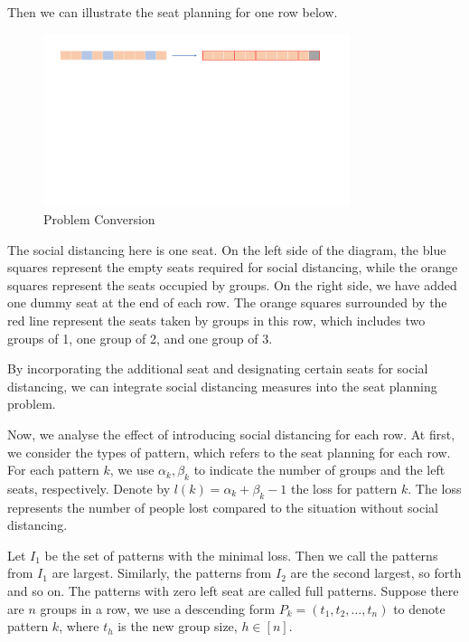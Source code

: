 Then we can illustrate the seat planning for one row below. 

\begin{figure}[ht]
    \centering
    \includegraphics[width = 0.8\textwidth]{./Figures/dummy_seat.pdf}
    \caption{Problem Conversion}
\end{figure}

The social distancing here is one seat. On the left side of the diagram, the blue squares represent the empty seats required for social distancing, while the orange squares represent the seats occupied by groups. On the right side, we have added one dummy seat at the end of each row. The orange squares surrounded by the red line represent the seats taken by groups in this row, which includes two groups of 1, one group of 2, and one group of 3.

By incorporating the additional seat and designating certain seats for social distancing, we can integrate social distancing measures into the seat planning problem.


Now, we analyse the effect of introducing social distancing for each row. At first, we consider the types of pattern, which refers to the seat planning for each row. For each pattern $k$, we use $\alpha_k, \beta_k$ to indicate the number of groups and the left seats, respectively. Denote by $l(k) = \alpha_k + \beta_k -1$ the loss for pattern $k$. The loss represents the number of people lost compared to the situation without social distancing.

Let $I_1$ be the set of patterns with the minimal loss. Then we call the patterns from $I_1$ are largest. Similarly, the patterns from $I_2$ are the second largest, so forth and so on. The patterns with zero left seat are called full patterns. Suppose there are $n$ groups in a row, we use a descending form $P_{k} = (t_1, t_2, \ldots, t_n)$ to denote pattern $k$, where $t_h$ is the new group size, $h \in [n]$. 

